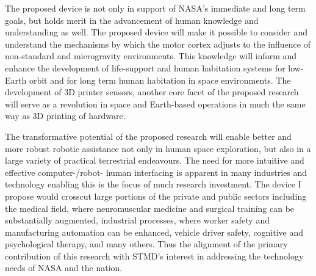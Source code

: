 \documentclass{article}
\begin{document}
The proposed device is not only in support of NASA’s immediate and long term goals, but holds merit in the advancement of human knowledge and understanding as well. The proposed device will make it possible to consider and understand the mechanisms by which the motor cortex adjusts to the influence of non-standard and microgravity environments. This knowledge will inform and enhance the development of life-support and human habitation systems for low-Earth orbit and for long term human habitation in space environments. The development of 3D printer sensors, another core facet of the proposed research will serve as a revolution in space and Earth-based operations in much the same way as 3D printing of hardware. 

The transformative potential of the proposed research will enable better and more robust robotic assistance not only in human space exploration, but also in a large variety of practical terrestrial endeavours. The need for more intuitive and effective computer-/robot- human interfacing is apparent in many industries and technology enabling this is the focus of much research investment. The device I propose would crosscut large portions of the private and public sectors including the medical field, where neuromuscular medicine and surgical training can be substantially augmented, industrial processes, where worker safety and manufacturing automation can be enhanced, vehicle driver safety, cognitive and psychological therapy, and many others. Thus the alignment of the primary contribution of this research with STMD’s interest in addressing the technology needs of NASA and the nation.
\end{document}

